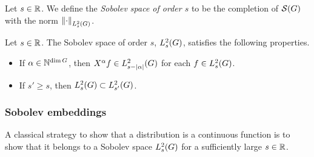 \begin{definition}
\label{definition:Sobolev_spaces}
    Let $s \in \R$.
    We define the \emph{Sobolev space of order $s$} to be the completion of $\Schwartz\Group$ with the norm $\norm[\Sobolev{s}]{\dummy}$.
\end{definition}

\begin{proposition}
\label{proposition:elementary_properties_of_Sobolev_spaces}
    Let $s \in \R$.
    The Sobolev space of order $s$, $\Sobolev s$, satisfies the following properties.
    \begin{itemize}
        \item If $\alpha \in \N^{\dim \Group}$, then $\LeftDifferentialOperator \alpha f \in \Sobolev {s - \abs \alpha}$
            for each $f \in \Sobolev s$.
        \item If $s' \geq s$, then $\Sobolev s \subset \Sobolev {s'}$.
    \end{itemize}
\end{proposition}

\subsubsection{Sobolev embeddings}

A classical strategy to show that a distribution is a continuous function
is to show that it belongs to a Sobolev space $\Sobolev s$ for a sufficiently large $s \in \R$.

